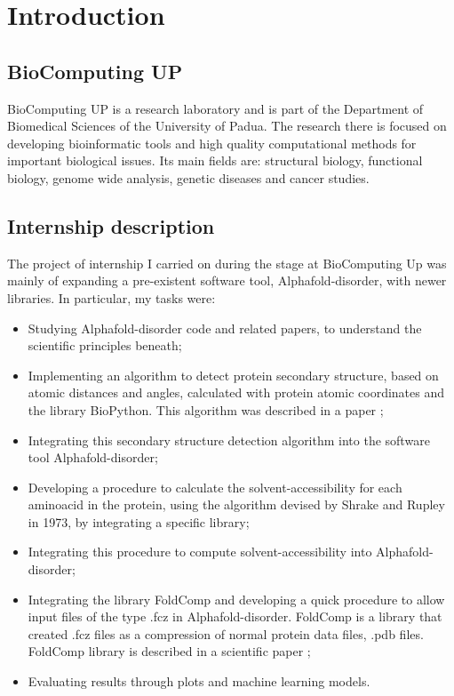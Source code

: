 \chapter{Introduction}
\label{chp:intro}

\section{BioComputing UP}
BioComputing UP is a research laboratory and is part of the Department of Biomedical Sciences of the University of Padua. The research there is focused on developing bioinformatic tools and high quality computational methods for important biological issues. Its main fields are: structural biology, functional biology, genome wide analysis, genetic diseases and cancer studies.
\section{Internship description}
The project of internship I carried on during the stage at BioComputing Up was mainly of expanding a pre-existent software tool, Alphafold-disorder, with newer libraries. In particular, my tasks were:
\begin{itemize}
    \item Studying Alphafold-disorder code and related papers, to understand the scientific principles beneath;
    \item Implementing an algorithm to detect protein secondary structure, based on atomic distances and angles, calculated with protein atomic coordinates and the library BioPython. This algorithm was described in a paper \cite{psea};
    \item Integrating this secondary structure detection algorithm into the software tool Alphafold-disorder;
    \item Developing a procedure to calculate the solvent-accessibility for each aminoacid in the protein, using the algorithm devised by Shrake and Rupley in 1973, by integrating a specific library;
    \item Integrating this procedure to compute solvent-accessibility into Alphafold-disorder;
    \item Integrating the library FoldComp and developing a quick procedure to allow input files of the type .fcz in Alphafold-disorder. FoldComp is a library that created .fcz files as a compression of normal protein data files, .pdb files. FoldComp library is described in a scientific paper \cite{foldcomp};
    \item Evaluating results through plots and machine learning models.
\end{itemize}

